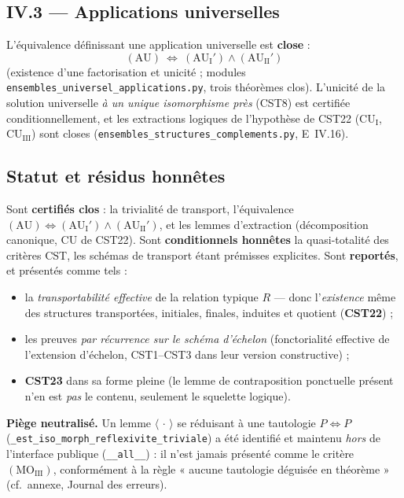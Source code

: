 \subsection{IV.3 --- Applications universelles}

L'équivalence définissant une application universelle est \textbf{close} :
\[
  (\mathrm{AU})\ \Longleftrightarrow\ (\mathrm{AU}_{\mathrm I}')\wedge
  (\mathrm{AU}_{\mathrm{II}}')
\]
(existence d'une factorisation et unicité ; modules
\texttt{ensembles\_universel\_applications.py}, trois théorèmes clos). L'unicité
de la solution universelle \emph{à un unique isomorphisme près} (CST8) est
certifiée conditionnellement, et les extractions logiques de l'hypothèse de
CST22 ($\mathrm{CU}_{\mathrm I}$, $\mathrm{CU}_{\mathrm{III}}$) sont closes
(\texttt{ensembles\_structures\_complements.py}, E~IV.16).

\subsection{Statut et résidus honnêtes}

Sont \textbf{certifiés clos} : la trivialité de transport, l'équivalence
$(\mathrm{AU})\Leftrightarrow(\mathrm{AU}_{\mathrm I}')\wedge(\mathrm{AU}_{\mathrm{II}}')$,
et les lemmes d'extraction (décomposition canonique, CU de CST22). Sont
\textbf{conditionnels honnêtes} la quasi-totalité des critères CST, les schémas
de transport étant prémisses explicites. Sont \textbf{reportés}, et présentés
comme tels :
\begin{itemize}
  \item la \emph{transportabilité effective} de la relation typique $R$ --- donc
        l'\emph{existence} même des structures transportées, initiales, finales,
        induites et quotient (\textbf{CST22}) ;
  \item les preuves \emph{par récurrence sur le schéma d'échelon} (fonctorialité
        effective de l'extension d'échelon, CST1--CST3 dans leur version
        constructive) ;
  \item \textbf{CST23} dans sa forme pleine (le lemme de contraposition
        ponctuelle présent n'en est \emph{pas} le contenu, seulement le squelette
        logique).
\end{itemize}

\textbf{Piège neutralisé.} Un lemme $\langle\,\cdot\,\rangle$ se réduisant à une
tautologie $P\Leftrightarrow P$
(\texttt{\_est\_iso\_morph\_reflexivite\_triviale}) a été identifié et maintenu
\emph{hors} de l'interface publique (\texttt{\_\_all\_\_}) : il n'est jamais
présenté comme le critère $(\mathrm{MO}_{\mathrm{III}})$, conformément à la règle
« aucune tautologie déguisée en théorème » (cf.\ annexe, Journal des erreurs).

